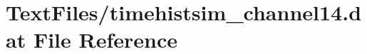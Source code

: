 \hypertarget{TextFiles_2timehistsim__channel14_8dat}{}\section{Text\+Files/timehistsim\+\_\+channel14.dat File Reference}
\label{TextFiles_2timehistsim__channel14_8dat}

